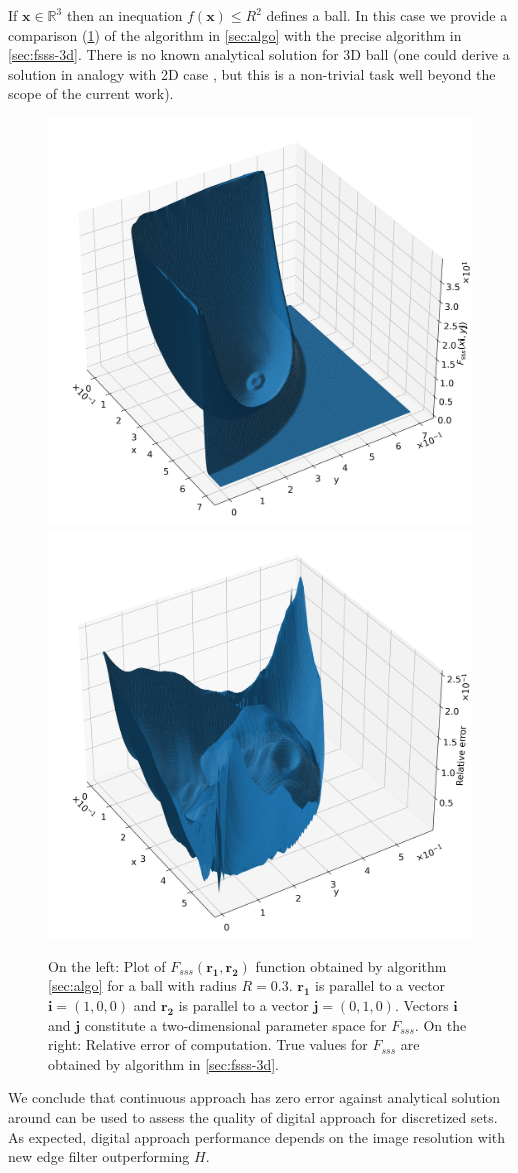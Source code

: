 \documentclass[preprint]{elsarticle}
\begin{document}
If $\bm{x} \in \mathbb{R}^3$ then an inequation $f(\bm{x}) \le R^2$ defines a
ball. In this case we provide a comparison (\cref{fig:fsss-ball}) of the
algorithm in \cref{sec:algo} with the precise algorithm in
\cref{sec:fsss-3d}. There is no known analytical solution for 3D ball (one could
derive a solution in analogy with 2D case \cite{Torquato_book}, but this is a
non-trivial task well beyond the scope of the current work).
\begin{figure}[!hpt]
  \centering
  \includegraphics[width=0.45\linewidth]{images/ball-sss.png}
  \hfill
  \includegraphics[width=0.45\linewidth]{images/ball-sss-error.png}
  \caption[]{On the left: Plot of $F_{sss}(\bm{r_1}, \bm{r_2})$ function
    obtained by algorithm \cref{sec:algo} for a ball with radius
    $R = 0.3$. $\bm{r_1}$ is parallel to a vector $\bm{i} = (1, 0, 0)$ and
    $\bm{r_2}$ is parallel to a vector $\bm{j} = (0, 1, 0)$. Vectors $\bm{i}$
    and $\bm{j}$ constitute a two-dimensional parameter space for $F_{sss}$. On
    the right: Relative error of computation. True values for $F_{sss}$ are
    obtained by algorithm in \cref{sec:fsss-3d}.}
  \label{fig:fsss-ball}
\end{figure}

We conclude that continuous approach has zero error against analytical solution
around can be used to assess the quality of digital approach for discretized
sets. As expected, digital approach performance depends on the image resolution
with new edge filter outperforming $H$.
\end{document}
